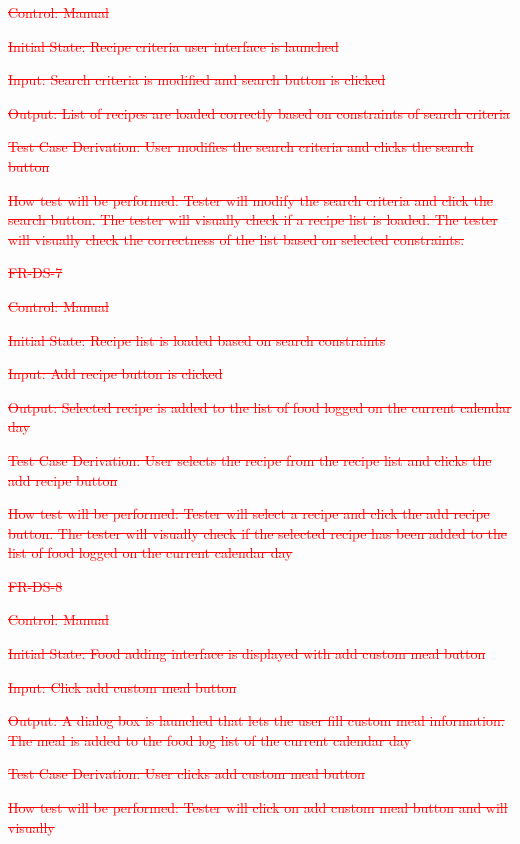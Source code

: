 \documentclass[12pt, titlepage]{article}
\begin{document}
\begin{enumerate}
{\textcolor{red}{\sout{Control: Manual}}

\textcolor{red}{\sout{Initial State: Recipe criteria user interface is launched}}

\textcolor{red}{\sout{Input: Search criteria is modified and search button is clicked}}

\textcolor{red}{\sout{Output: List of recipes are loaded correctly based on constraints of search criteria}}

\textcolor{red}{\sout{Test Case Derivation: User modifies the search criteria and clicks the search button}}

\textcolor{red}{\sout{How test will be performed: Tester will modify the search criteria and click the search button. The tester will visually check if a recipe list is loaded. The tester will visually check the correctness of the list based on selected constraints.}}

\item{\textcolor{red}{\sout{FR-DS-7}}\\}

\textcolor{red}{\sout{Control: Manual}}

\textcolor{red}{\sout{Initial State: Recipe list is loaded based on search constraints}}

\textcolor{red}{\sout{Input: Add recipe button is clicked}}

\textcolor{red}{\sout{Output: Selected recipe is added to the list of food logged on the current calendar day}}

\textcolor{red}{\sout{Test Case Derivation: User selects the recipe from the recipe list and clicks the add recipe button}}

\textcolor{red}{\sout{How test will be performed: Tester will select a recipe and click the add recipe button. The tester will visually check if the selected recipe has been added to the list of food logged on the current calendar day}}

\item{\textcolor{red}{\sout{FR-DS-8}}\\}

\textcolor{red}{\sout{Control: Manual}}

\textcolor{red}{\sout{Initial State: Food adding interface is displayed with add custom meal button}}

\textcolor{red}{\sout{Input: Click add custom meal button}}

\textcolor{red}{\sout{Output: A dialog box is launched that lets the user fill custom meal information. The meal is added to the food log list of the current calendar day}}

\textcolor{red}{\sout{Test Case Derivation: User clicks add custom meal button}}

\textcolor{red}{\sout{How test will be performed: Tester will click on add custom meal button and will visually}}
}
\end{enumerate}
\end{document}
